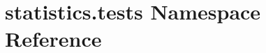 \hypertarget{namespacestatistics_1_1tests}{}\section{statistics.\+tests Namespace Reference}
\label{namespacestatistics_1_1tests}
